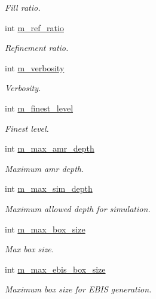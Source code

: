 \begin{DoxyCompactItemize}
\begin{DoxyCompactList}\small\item\em Fill ratio. \end{DoxyCompactList}\item 
int \hyperlink{classamr__mesh_abff7af18596c17ac7cbfb30e26d18437}{m\+\_\+ref\+\_\+ratio}
\begin{DoxyCompactList}\small\item\em Refinement ratio. \end{DoxyCompactList}\item 
int \hyperlink{classamr__mesh_a5038b3f9e7d3e6df7c0851fd983a9b10}{m\+\_\+verbosity}
\begin{DoxyCompactList}\small\item\em Verbosity. \end{DoxyCompactList}\item 
int \hyperlink{classamr__mesh_ab03dc79ee887c22a2c15a5e1ae1ed88c}{m\+\_\+finest\+\_\+level}
\begin{DoxyCompactList}\small\item\em Finest level. \end{DoxyCompactList}\item 
int \hyperlink{classamr__mesh_a8bdb6d337b7ed7d38b3284f487a8bec6}{m\+\_\+max\+\_\+amr\+\_\+depth}
\begin{DoxyCompactList}\small\item\em Maximum amr depth. \end{DoxyCompactList}\item 
int \hyperlink{classamr__mesh_a325befd987163bba8a6ad9e87ae5e6a8}{m\+\_\+max\+\_\+sim\+\_\+depth}
\begin{DoxyCompactList}\small\item\em Maximum allowed depth for simulation. \end{DoxyCompactList}\item 
int \hyperlink{classamr__mesh_a9edf00a92abe19643287778d08cc7e7d}{m\+\_\+max\+\_\+box\+\_\+size}
\begin{DoxyCompactList}\small\item\em Max box size. \end{DoxyCompactList}\item 
int \hyperlink{classamr__mesh_a250a2cb3d46e1870223f28532c1584ac}{m\+\_\+max\+\_\+ebis\+\_\+box\+\_\+size}
\begin{DoxyCompactList}\small\item\em Maximum box size for E\+B\+IS generation. \end{DoxyCompactList}\item 

\end{DoxyCompactItemize}
